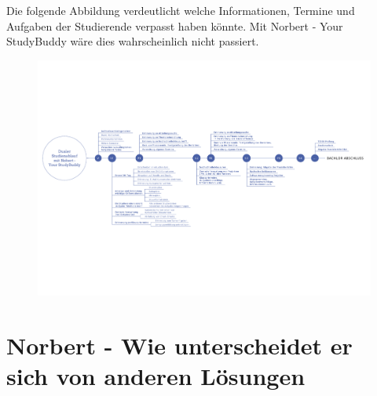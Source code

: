 Die folgende Abbildung verdeutlicht welche Informationen, Termine und Aufgaben der Studierende verpasst haben könnte. Mit Norbert - Your StudyBuddy wäre dies wahrscheinlich nicht passiert.

\newpage
\begin{landscape}
\vspace*{35mm}
	\begin{figure}[H]
	\centering
	\includegraphics[scale=0.75]{images/timeline.pdf}
	\end{figure}

\end{landscape}

\newpage

\section{Norbert - Wie unterscheidet er sich von anderen Lösungen}